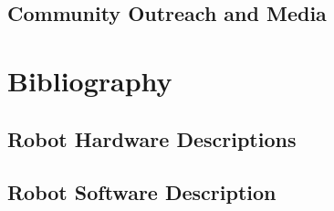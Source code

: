 \documentclass[runningheads,a4paper]{llncs}
\begin{document}
\subsection{Community Outreach and Media}




\section*{Bibliography}




%
\newpage
\subsection{Robot Hardware Descriptions}

\newpage
\subsection{Robot Software Description}

%
\end{document}
